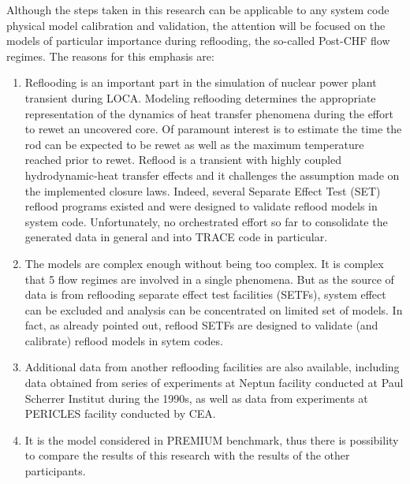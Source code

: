 \documentclass[11pt,titlepage]{article}
\begin{document}
Although the steps taken in this research can be applicable to any system code physical model calibration and validation, the attention will be focused on the models of particular importance during reflooding, the so-called Post-CHF flow regimes. The reasons for this emphasis are:
\begin{enumerate}
	\item Reflooding is an important part in the simulation of nuclear power plant transient during LOCA. Modeling reflooding determines the appropriate representation of the dynamics of heat transfer phenomena during the effort to rewet an uncovered core. Of paramount interest is to estimate the time the rod can be expected to be rewet as well as the maximum temperature reached prior to rewet. Reflood is a transient with highly coupled hydrodynamic-heat transfer effects and it challenges the assumption made on the implemented closure laws. Indeed, several Separate Effect Test (SET) reflood programs existed and were designed to validate reflood models in system code. Unfortunately, no orchestrated effort so far to consolidate the generated data in general and into TRACE code in particular.
	\item The models are complex enough without being too complex. It is complex that 5 flow regimes are involved in a single phenomena. But as the source of data is from reflooding separate effect test facilities (SETFs), system effect can be excluded and analysis can be concentrated on limited set of models. In fact, as already pointed out, reflood SETFs are designed to validate (and calibrate) reflood models in sytem codes.
	\item Additional data from another reflooding facilities are also available, including data obtained from series of experiments at Neptun facility conducted at Paul Scherrer Institut during the 1990s, as well as data from experiments at PERICLES facility conducted by CEA.
	\item It is the model considered in PREMIUM benchmark, thus there is possibility to compare the results of this research with the results of the other participants.
\end{enumerate}
\end{document}
